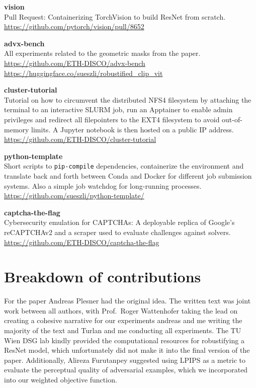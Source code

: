 \documentclass[a4paper, oneside]{discothesis}
\newcommand{\linebreaks}{\vspace*{0.5em}}
\begin{document}
\linebreaks

\textbf{vision} \\
Pull Request: Containerizing TorchVision to build ResNet from scratch. \\
\url{https://github.com/pytorch/vision/pull/8652}

\linebreaks

\textbf{advx-bench} \\
All experiments related to the geometric masks from the paper. \\
\url{https://github.com/ETH-DISCO/advx-bench} \\
\url{https://huggingface.co/sueszli/robustified_clip_vit}

\linebreaks

\textbf{cluster-tutorial} \\
Tutorial on how to circumvent the distributed NFS4 filesystem by attaching the terminal to an interactive SLURM job, run an Apptainer to enable admin privileges and redirect all filepointers to the EXT4 filesystem to avoid out-of-memory limits. A Jupyter notebook is then hosted on a public IP address. \\
\url{https://github.com/ETH-DISCO/cluster-tutorial}

\linebreaks

\textbf{python-template} \\
Short scripts to \texttt{pip-compile} dependencies, containerize the environment and translate back and forth between Conda and Docker for different job submission systems. Also a simple job watchdog for long-running processes. \\ 
\url{https://github.com/sueszli/python-template/}

\linebreaks

\textbf{captcha-the-flag} \\
Cybersecurity emulation for CAPTCHAs: A deployable replica of Google's reCAPTCHAv2 and a scraper used to evaluate challenges against solvers. \\
\url{https://github.com/ETH-DISCO/captcha-the-flag}

\section*{Breakdown of contributions}

For the paper Andreas Plesner had the original idea. The written text was joint work between all authors, with Prof.\ Roger Wattenhofer taking the lead on creating a cohesive narrative for our experiments andreas and me writing the majority of the text and Turlan and me conducting all experiments. The TU Wien DSG lab kindly provided the computational resources for robustifying a ResNet model, which unfortunately did not make it into the final version of the paper. Additionally, Alireza Furutanpey suggested using LPIPS as a metric to evaluate the perceptual quality of adversarial examples, which we incorporated into our weighted objective function.
\end{document}
